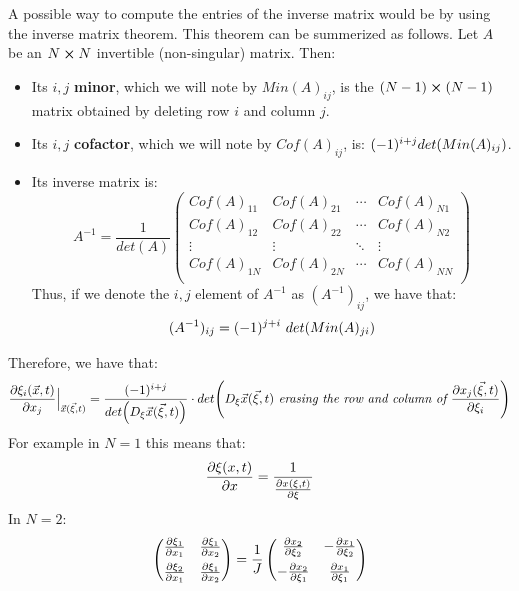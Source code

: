 \documentclass[11pt, a4paper]{article} %
\begin{document}
A possible way to compute the entries of the inverse matrix would be by using the inverse matrix theorem. This theorem can be summerized as follows. Let $A$ be an $N\cross N$ invertible (non-singular) matrix. Then:
\begin{itemize}
\item Its $i,j$ {\bf minor}, which we will note by $Min(A)_{ij}$, is the $(N-1)\cross (N-1)$ matrix obtained by deleting row $i$ and column $j$.
\item Its $i,j$ {\bf cofactor}, which we will note by $Cof(A)_{ij}$, is: $(-1)^{i+j}det\qty(Min(A)_{ij})$.
\item Its inverse matrix is:
\begin{equation}
A^{-1}=\frac{1}{det(A)} \begin{pmatrix}
Cof(A)_{11} & Cof(A)_{21}&\cdots& Cof(A)_{N1}\\
Cof(A)_{12} & Cof(A)_{22}&\cdots& Cof(A)_{N2}\\
\vdots & \vdots & \ddots & \vdots \\
Cof(A)_{1N} & Cof(A)_{2N}&\cdots& Cof(A)_{NN}\\
\end{pmatrix}
\end{equation}
Thus, if we denote the $i,j$ element of $A^{-1}$ as $(A^{-1})_{ij}$, we have that:
\begin{equation}
(A^{-1})_{ij} = (-1)^{j+i}\ det\qty(Min(A)_{ji} )
\end{equation}
\end{itemize}
Therefore, we have that:
\begin{equation}
\pdv{\xi_i(\vec{x},t)}{x_j}\Big\rvert_{\vec{x}(\vec{\xi},t)} = \frac{ (-1)^{i+j}}{det \qty(D_{\xi} \vec{x}(\vec{\xi},t))}\cdot det \qty(D_{\xi} \vec{x}(\vec{\xi},t)\textit{ erasing the row and column of }\pdv{x_j(\vec{\xi},t)}{\xi_i} )
\end{equation}
For example in $N=1$ this means that:
\begin{equation}
\pdv{\xi(x,t)}{x}=\frac{1}{\pdv{x(\xi,t)}{\xi}}
\end{equation}
In $N=2$:
\begin{equation}
\begin{pmatrix}
\pdv{\xi_1}{x_1} & \pdv{\xi_1}{x_2} \vspace{0.15cm}\\
\pdv{\xi_2}{x_1} & \pdv{\xi_1}{x_2}
\end{pmatrix}= \frac{1}{J} \begin{pmatrix}
\pdv{x_2}{\xi_2} & - \pdv{x_1}{\xi_2} \vspace{0.15cm}\\
-\pdv{x_2}{\xi_1} & \pdv{x_1}{\xi_1
} 
\end{pmatrix}
\end{equation}
\end{document}
